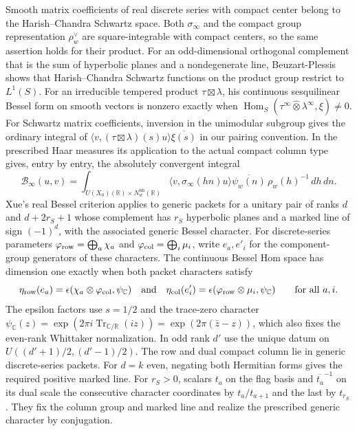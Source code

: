 Smooth matrix coefficients of real discrete series with compact
center belong to the Harish--Chandra Schwartz space. Both
\(\sigma_\infty\) and the compact group representation \(\rho_w^\vee\)
are square-integrable with compact centers, so the same assertion
holds for their product.
\cite[\S7.2]{p2ichino-real-theta}
For an odd-dimensional orthogonal complement that is the sum of
hyperbolic planes and a nondegenerate line, Beuzart-Plessis shows
that Harish--Chandra Schwartz functions on the product group restrict
to \(L^1(S)\). For an irreducible tempered product \(\tau\boxtimes\lambda\),
his continuous sesquilinear Bessel form on smooth vectors is nonzero
exactly when \(\operatorname{Hom}_S(\tau^\infty
\widehat\otimes\lambda^\infty,\xi)\ne0\). For Schwartz matrix
coefficients, inversion in the unimodular subgroup gives the
ordinary integral of \(\langle v,(\tau\boxtimes\lambda)(s)u\rangle
\overline{\xi(s)}\) in our pairing convention.
\cite[\S6.2, Lemma~6.5.1(ii), \S7.1 and Theorem~7.2.1]{p2beuzart}
In the prescribed Haar measures its application to the actual compact
column type gives, entry by entry, the absolutely convergent integral
\[
 \mathcal B_\infty(u,v)
 =\int_{U(X_0)(\mathbb R)\times N_w^{\mathrm{un}}(\mathbb R)}
  \big\langle v,\sigma_\infty(hn)u\big\rangle
  \overline{\psi_w(n)}\,\rho_w(h)^{-1}\,dh\,dn .
\]
Xue's real Bessel criterion applies to generic packets for a unitary
pair of ranks \(d\) and \(d+2r_S+1\) whose complement has \(r_S\)
hyperbolic planes and a marked line of sign \((-1)^d\), with the
associated generic Bessel character. For discrete-series parameters
\(\varphi_{\rm row}=\bigoplus_a\chi_a\) and
\(\varphi_{\rm col}=\bigoplus_i\mu_i\), write \(e_a,e'_i\) for the
component-group generators of these characters. The continuous Bessel
Hom space has dimension one exactly when both packet characters satisfy
\[
 \eta_{\rm row}(e_a)=\epsilon(\chi_a\otimes\varphi_{\rm col},\psi_{\mathbb C})
 \quad\text{and}\quad
 \eta_{\rm col}(e'_i)=\epsilon(\varphi_{\rm row}\otimes\mu_i,\psi_{\mathbb C})
 \qquad\text{for all }a,i .
\]
The epsilon factors use \(s=1/2\) and the trace-zero character
\(\psi_{\mathbb C}(z)=\exp(2\pi i\operatorname{Tr}_{\mathbb C/\mathbb R}(iz))
=\exp(2\pi(\bar z-z))\), which also fixes the even-rank Whittaker
normalization. In odd rank \(d'\) use the unique datum on
\(U((d'+1)/2,(d'-1)/2)\).
\cite[\S\S1.1--1.2, Theorem~1.1]{p2xue-bessel}
The row and dual compact column lie in generic discrete-series
packets. For \(d=k\) even, negating both Hermitian forms gives the
required positive marked line. For \(r_S>0\), scalars \(t_a\) on the flag
basis and \(\overline{t_a}^{-1}\) on its dual scale the consecutive
character coordinates by \(t_a/t_{a+1}\) and the last by \(t_{r_S}\).
They fix the column group and marked line and realize the prescribed
generic character by conjugation.

